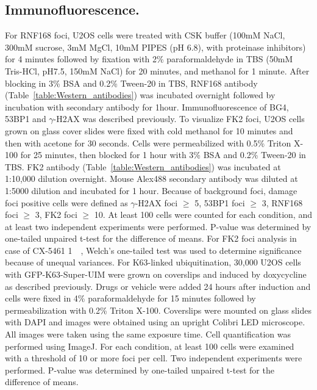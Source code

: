 \subsection{Immunofluorescence.}
For RNF168 foci, U2OS cells were treated with CSK buffer (100mM NaCl, 300mM sucrose, 3mM MgCl, 10mM PIPES (pH 6.8), with proteinase inhibitors) for 4 minutes followed by fixation with 2\% paraformaldehyde in TBS (50mM Tris-HCl, pH7.5, 150mM NaCl) for 20 minutes, and methanol for 1 minute. After blocking in 3\% BSA and 0.2\% Tween-20 in TBS, RNF168 antibody (Table~\ref{table:Western_antibodies}) was incubated overnight followed by incubation with secondary antibody for 1hour. Immunofluorescence of BG4, 53BP1 and $\gamma$-H2AX was described previously\cite{Xu2017}. To visualize FK2 foci, U2OS cells grown on glass cover slides were fixed with cold methanol for 10 minutes and then with acetone for 30 seconds. Cells were permeabilized with 0.5\% Triton X-100 for 25 minutes, then blocked for 1 hour with 3\% BSA and 0.2\% Tween-20 in TBS. FK2 antibody (Table~\ref{table:Western_antibodies}) was incubated at 1:10,000 dilution overnight. Mouse Alex488 secondary antibody was diluted at 1:5000 dilution and incubated for 1 hour. Because of background foci, damage foci positive cells were defined as $\gamma$-H2AX foci $\geq$ 5, 53BP1 foci $\geq$ 3, RNF168 foci $\geq$ 3, FK2 foci $\geq$ 10. At least 100 cells were counted for each condition, and at least two independent experiments were performed. P-value was determined by one-tailed unpaired t-test for the difference of means. For FK2 foci analysis in case of CX-5461 \SI{1}{\micro\Molar}, Welch's one-tailed test was used to determine significance because of unequal variances.  
For K63-linked ubiquitination, 30,000 U2OS cells with GFP-K63-Super-UIM were grown on coverslips and induced by doxycycline as described previously\cite{Thorslund2015}. Drugs or vehicle were added 24 hours after induction and cells were fixed in 4\% paraformaldehyde for 15 minutes    followed by permeabilization with 0.2\% Triton X-100. Coverslips were mounted on glass slides with DAPI and images were obtained using an upright Colibri LED microscope. All images were taken using the same exposure time. Cell quantification was performed using ImageJ. For each condition, at least 100 cells were examined with a threshold of 10 or more foci per cell. Two independent experiments were performed. P-value was determined by one-tailed unpaired t-test for the difference of means.

